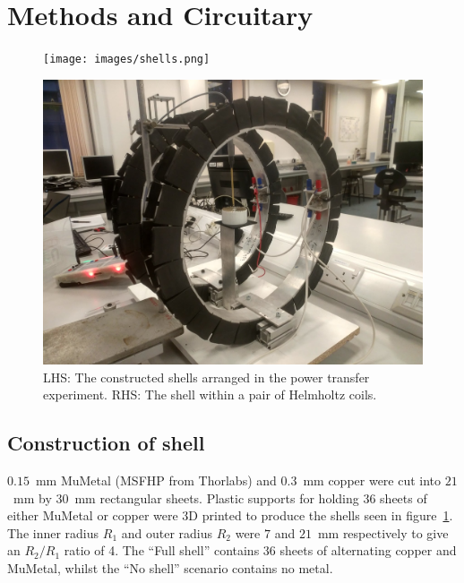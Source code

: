 \documentclass[11pt]{iopart}
\begin{document}
\section{Methods and Circuitary}
\begin{figure}
\begin{center}
    \begin{minipage}{0.315\textwidth}
        \noindent\texttt{[image: images/shells.png]}
    \end{minipage}
    \begin{minipage}{0.553\textwidth}
        \noindent\includegraphics[width=\linewidth]{images/helm.png}
    \end{minipage}
\caption{LHS: The constructed shells arranged in the power transfer
  experiment. RHS: The shell within a pair of Helmholtz coils.}
\label{fig:shells}
\end{center}
\end{figure}

\subsection{Construction of shell}
$0.15$~mm MuMetal (MSFHP from Thorlabs) and $0.3$~mm copper were cut
into $21$~mm by $30$~mm rectangular sheets.  Plastic supports for
holding $36$ sheets of either MuMetal or copper were 3D printed to
produce the shells seen in figure~\ref{fig:shells}. The inner radius
$R_1$ and outer radius $R_2$ were $7$ and $21$~mm respectively to give
an $R_2/R_1$ ratio of 4. The ``Full shell'' contains $36$ sheets of
alternating copper and MuMetal, whilst the ``No shell'' scenario
contains no metal. \\
\end{document}
